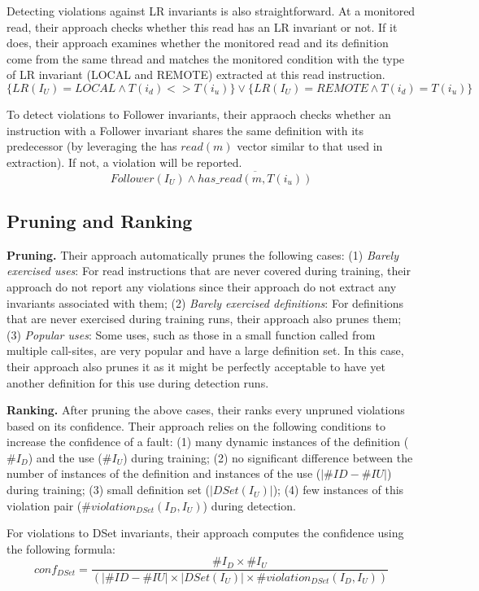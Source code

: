 Detecting violations against LR invariants is also straightforward. At a monitored read, their approach checks whether this read has an LR invariant or not. If it does, their approach examines whether the monitored read and its definition come from the same thread and matches the monitored condition with the type of LR invariant (LOCAL and REMOTE) extracted at this read instruction. 
$$\{LR(I_U) = LOCAL \wedge T(i_d) <> T(i_u)\} \vee \{LR(I_U) = REMOTE \wedge T(i_d) = T(i_u)\}$$

To detect violations to Follower invariants, their appraoch checks whether an instruction with a Follower invariant shares the same definition with its predecessor (by leveraging the has $read(m)$ vector similar to that used in extraction). If not, a violation will be reported.
$$Follower(I_U) \wedge \overline{has\_read(m,T(i_u))}$$

\subsection{Pruning and Ranking}
\textbf{Pruning.} Their approach automatically prunes the following cases: (1) \textit{Barely exercised uses}: For read instructions that are never covered during training, their approach do not report any violations since their approach do not extract any invariants associated with them; (2) \textit{Barely exercised definitions}: For definitions that are never exercised during training runs, their approach also prunes them; (3) \textit{Popular uses}: Some uses, such as those in a small function called from multiple call-sites, are very popular and have a large definition set. In this case, their approach also prunes it as it might be perfectly acceptable to have yet another definition for this use during detection runs.

\textbf{Ranking.} After pruning the above cases, their ranks every unpruned violations based on its confidence. Their approach relies on the following conditions to increase the confidence of a fault: (1) many dynamic instances of the definition ($\#I_D$) and the use ($\#I_U$) during training; (2) no significant difference between the number of instances of the definition and instances of the use ($|\#ID - \#IU|$) during training; (3) small definition set ($|DSet(I_U)|$); (4) few instances of this violation pair ($\#violation_{DSet}(I_D, I_U)$) during detection.

For violations to DSet invariants, their approach computes the confidence using the following formula:
$$conf_{DSet} = \frac{\#I_D \times \#I_U}{(|\#ID - \#IU| \times |DSet(I_U)| \times \#violation_{DSet}(I_D, I_U))}$$

